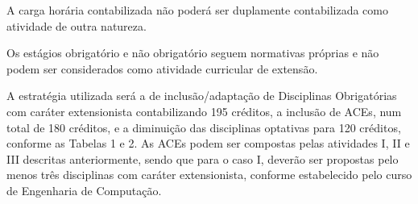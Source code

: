 \bigskip

A carga horária contabilizada não poderá ser duplamente contabilizada como atividade de outra natureza.


\bigskip

Os estágios obrigatório e não obrigatório seguem normativas próprias e não podem ser considerados como atividade
curricular de extensão.


\bigskip



A estratégia utilizada será a de inclusão/adaptação de Disciplinas Obrigatórias com caráter extensionista contabilizando
195 créditos, a inclusão de ACEs, num total de 180 créditos, e a diminuição das disciplinas optativas para 120
créditos, conforme as Tabelas 1 e 2. As ACEs podem ser compostas pelas atividades I, II e III descritas anteriormente, sendo
que para o caso I, deverão ser propostas pelo menos três disciplinas com caráter extensionista, conforme estabelecido
pelo curso de Engenharia de Computação.


\bigskip


